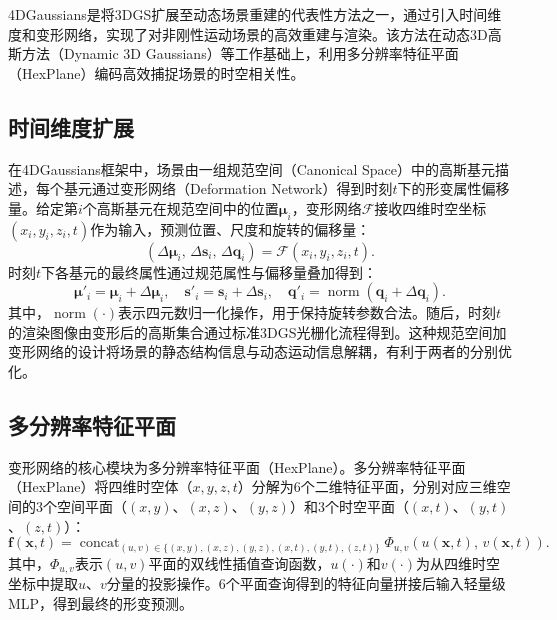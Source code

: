 4DGaussians是将3DGS扩展至动态场景重建的代表性方法之一，通过引入时间维度和变形网络，实现了对非刚性运动场景的高效重建与渲染。该方法在动态3D高斯方法（Dynamic 3D Gaussians）等工作基础上，利用多分辨率特征平面（HexPlane）编码高效捕捉场景的时空相关性。

\subsection{时间维度扩展}

在4DGaussians框架中，场景由一组规范空间（Canonical Space）中的高斯基元描述，每个基元通过变形网络（Deformation Network）得到时刻$t$下的形变属性偏移量。给定第$i$个高斯基元在规范空间中的位置$\boldsymbol{\mu}_i$，变形网络$\mathcal{F}$接收四维时空坐标$(x_i, y_i, z_i, t)$作为输入，预测位置、尺度和旋转的偏移量：
\begin{equation}
    (\Delta\boldsymbol{\mu}_i,\, \Delta\mathbf{s}_i,\, \Delta\mathbf{q}_i) = \mathcal{F}(x_i, y_i, z_i, t).
    \label{eq:deform_network}
\end{equation}时刻$t$下各基元的最终属性通过规范属性与偏移量叠加得到：
\begin{equation}
    \boldsymbol{\mu}'_i = \boldsymbol{\mu}_i + \Delta\boldsymbol{\mu}_i,\quad
    \mathbf{s}'_i = \mathbf{s}_i + \Delta\mathbf{s}_i,\quad
    \mathbf{q}'_i = \operatorname{norm}\!\left(\mathbf{q}_i + \Delta\mathbf{q}_i\right).
    \label{eq:deform_apply}
\end{equation}其中，$\operatorname{norm}(\cdot)$表示四元数归一化操作，用于保持旋转参数合法。随后，时刻$t$的渲染图像由变形后的高斯集合通过标准3DGS光栅化流程得到。这种规范空间加变形网络的设计将场景的静态结构信息与动态运动信息解耦，有利于两者的分别优化。

\subsection{多分辨率特征平面}

变形网络的核心模块为多分辨率特征平面（HexPlane）。多分辨率特征平面（HexPlane）将四维时空体（$x, y, z, t$）分解为6个二维特征平面，分别对应三维空间的3个空间平面（$(x,y)$、$(x,z)$、$(y,z)$）和3个时空平面（$(x,t)$、$(y,t)$、$(z,t)$）：
\begin{equation}
    \mathbf{f}(\mathbf{x}, t) =
    \operatorname{concat}_{(u,v) \in \{(x,y),(x,z),(y,z),(x,t),(y,t),(z,t)\}}
    \Phi_{u,v}\!\left(u(\mathbf{x},t),\, v(\mathbf{x},t)\right).
    \label{eq:hexplane}
\end{equation}其中，$\Phi_{u,v}$表示$(u,v)$平面的双线性插值查询函数，$u(\cdot)$和$v(\cdot)$为从四维时空坐标中提取$u$、$v$分量的投影操作。6个平面查询得到的特征向量拼接后输入轻量级MLP，得到最终的形变预测。

